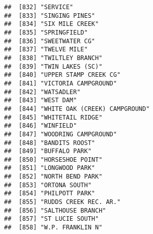 \documentclass[
]{article}
\begin{document}
\begin{verbatim}
##  [832] "SERVICE"                                                                             
##  [833] "SINGING PINES"                                                                       
##  [834] "SIX MILE CREEK"                                                                      
##  [835] "SPRINGFIELD"                                                                         
##  [836] "SWEETWATER CG"                                                                       
##  [837] "TWELVE MILE"                                                                         
##  [838] "TWILTLEY BRANCH"                                                                     
##  [839] "TWIN LAKES (SC)"                                                                     
##  [840] "UPPER STAMP CREEK CG"                                                                
##  [841] "VICTORIA CAMPGROUND"                                                                 
##  [842] "WATSADLER"                                                                           
##  [843] "WEST DAM"                                                                            
##  [844] "WHITE OAK (CREEK) CAMPGROUND"                                                        
##  [845] "WHITETAIL RIDGE"                                                                     
##  [846] "WINFIELD"                                                                            
##  [847] "WOODRING CAMPGROUND"                                                                 
##  [848] "BANDITS ROOST"                                                                       
##  [849] "BUFFALO PARK"                                                                        
##  [850] "HORSESHOE POINT"                                                                     
##  [851] "LONGWOOD PARK"                                                                       
##  [852] "NORTH BEND PARK"                                                                     
##  [853] "ORTONA SOUTH"                                                                        
##  [854] "PHILPOTT PARK"                                                                       
##  [855] "RUDDS CREEK REC. AR."                                                                
##  [856] "SALTHOUSE BRANCH"                                                                    
##  [857] "ST LUCIE SOUTH"                                                                      
##  [858] "W.P. FRANKLIN N"                                                                     

\end{verbatim}
\end{document}
